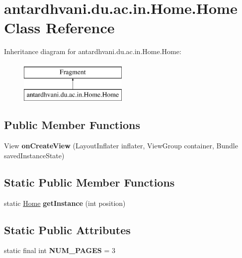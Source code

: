 \hypertarget{classantardhvani_1_1du_1_1ac_1_1in_1_1_home_1_1_home}{}\section{antardhvani.\+du.\+ac.\+in.\+Home.\+Home Class Reference}
\label{classantardhvani_1_1du_1_1ac_1_1in_1_1_home_1_1_home}
Inheritance diagram for antardhvani.\+du.\+ac.\+in.\+Home.\+Home\+:\begin{figure}[H]
\begin{center}
\leavevmode
\includegraphics[height=2.000000cm]{classantardhvani_1_1du_1_1ac_1_1in_1_1_home_1_1_home}
\end{center}
\end{figure}
\subsection*{Public Member Functions}
\begin{DoxyCompactItemize}
\item 
\hypertarget{classantardhvani_1_1du_1_1ac_1_1in_1_1_home_1_1_home_a9544f573a1f1ba3dc57551a0ae143f15}{}View {\bfseries on\+Create\+View} (Layout\+Inflater inflater, View\+Group container, Bundle saved\+Instance\+State)\label{classantardhvani_1_1du_1_1ac_1_1in_1_1_home_1_1_home_a9544f573a1f1ba3dc57551a0ae143f15}

\end{DoxyCompactItemize}
\subsection*{Static Public Member Functions}
\begin{DoxyCompactItemize}
\item 
\hypertarget{classantardhvani_1_1du_1_1ac_1_1in_1_1_home_1_1_home_aaec1f660b4097acb42fccc8db6c4169d}{}static \hyperlink{classantardhvani_1_1du_1_1ac_1_1in_1_1_home_1_1_home}{Home} {\bfseries get\+Instance} (int position)\label{classantardhvani_1_1du_1_1ac_1_1in_1_1_home_1_1_home_aaec1f660b4097acb42fccc8db6c4169d}

\end{DoxyCompactItemize}
\subsection*{Static Public Attributes}
\begin{DoxyCompactItemize}
\item 
\hypertarget{classantardhvani_1_1du_1_1ac_1_1in_1_1_home_1_1_home_a06b044d951a22ab9c9bee5b0281c6918}{}static final int {\bfseries N\+U\+M\+\_\+\+P\+A\+G\+E\+S} = 3\label{classantardhvani_1_1du_1_1ac_1_1in_1_1_home_1_1_home_a06b044d951a22ab9c9bee5b0281c6918}

\end{DoxyCompactItemize}


